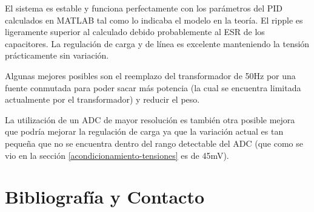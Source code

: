 \documentclass[12pt]{report}
\begin{document}
El sistema es estable y funciona perfectamente con los parámetros del PID calculados en MATLAB tal como lo indicaba el modelo en la teoría. El ripple es ligeramente superior al calculado debido probablemente al ESR de los capacitores. La regulación de carga y de línea es excelente manteniendo la tensión prácticamente sin variación.

Algunas mejores posibles son el reemplazo del transformador de 50Hz por una fuente conmutada para poder sacar más potencia (la cual se encuentra limitada actualmente por el transformador) y reducir el peso. 

La utilización de un ADC de mayor resolución es también otra posible mejora que podría mejorar la regulación de carga ya que la variación actual es tan pequeña que no se encuentra dentro del rango detectable del ADC (que como se vio en la sección \ref{acondicionamiento-tensiones} es de 45mV).

\newpage
\chapter{Bibliografía y Contacto}
\end{document}
